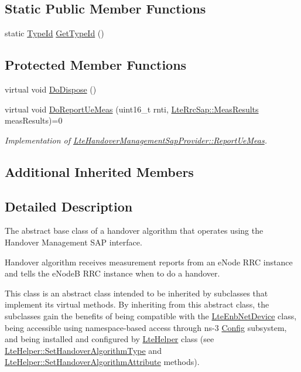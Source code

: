 \subsection*{Static Public Member Functions}
\begin{DoxyCompactItemize}
\item 
static \hyperlink{classns3_1_1TypeId}{Type\+Id} \hyperlink{classns3_1_1LteHandoverAlgorithm_af0901a842bccd915c6028ba7569d4578}{Get\+Type\+Id} ()
\end{DoxyCompactItemize}
\subsection*{Protected Member Functions}
\begin{DoxyCompactItemize}
\item 
virtual void \hyperlink{classns3_1_1LteHandoverAlgorithm_acb41503e8dd1313690d0da69f9eba564}{Do\+Dispose} ()
\item 
virtual void \hyperlink{classns3_1_1LteHandoverAlgorithm_a6ff069477dd5902b2e564e5cf88bac64}{Do\+Report\+Ue\+Meas} (uint16\+\_\+t rnti, \hyperlink{structns3_1_1LteRrcSap_1_1MeasResults}{Lte\+Rrc\+Sap\+::\+Meas\+Results} meas\+Results)=0
\begin{DoxyCompactList}\small\item\em Implementation of \hyperlink{classns3_1_1LteHandoverManagementSapProvider_a5daca6a055e4f8794f7f1e8ba1077b15}{Lte\+Handover\+Management\+Sap\+Provider\+::\+Report\+Ue\+Meas}. \end{DoxyCompactList}\end{DoxyCompactItemize}
\subsection*{Additional Inherited Members}


\subsection{Detailed Description}
The abstract base class of a handover algorithm that operates using the Handover Management S\+AP interface. 

Handover algorithm receives measurement reports from an e\+Node R\+RC instance and tells the e\+NodeB R\+RC instance when to do a handover.

This class is an abstract class intended to be inherited by subclasses that implement its virtual methods. By inheriting from this abstract class, the subclasses gain the benefits of being compatible with the \hyperlink{classns3_1_1LteEnbNetDevice}{Lte\+Enb\+Net\+Device} class, being accessible using namespace-\/based access through ns-\/3 \hyperlink{namespacens3_1_1Config}{Config} subsystem, and being installed and configured by \hyperlink{classns3_1_1LteHelper}{Lte\+Helper} class (see \hyperlink{classns3_1_1LteHelper_a6301630b8a7082043efff2a7aaaa1d20}{Lte\+Helper\+::\+Set\+Handover\+Algorithm\+Type} and \hyperlink{classns3_1_1LteHelper_a4da448bb1d3d13534cc54f6b7d33f26a}{Lte\+Helper\+::\+Set\+Handover\+Algorithm\+Attribute} methods).


